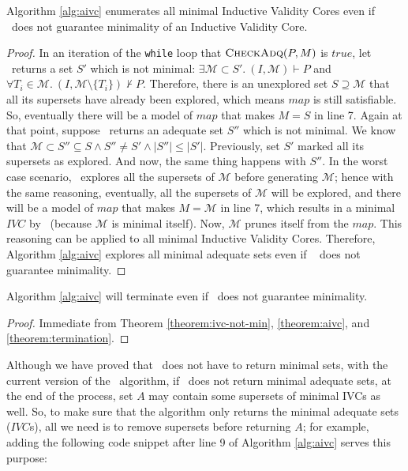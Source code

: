 \begin{theorem}
\label{theorem:ivc-not-min}
  Algorithm \ref{alg:aivc} enumerates all minimal Inductive Validity Cores
  even if \getivc ~does not guarantee minimality of an Inductive Validity Core.
\end{theorem}
\begin{proof}
In an iteration of the \texttt{while} loop that $\textsc{CheckAdq} (P, M)$ is $true$,
let \getivc ~returns a set $S'$ which is not minimal:
$\exists \mathcal{M} \subset S'.~ (I, \mathcal{M}) \vdash P$ and
$\forall T_i \in \mathcal{M} . ~ (I, \mathcal{M} \setminus \{T_i\}) \nvdash P$.
Therefore, there is an unexplored set $S \supseteq \mathcal{M}$ that all its supersets have already been explored, which means
$map$ is still satisfiable.
So, eventually there will be a model of $map$ that makes $M = S$ in line 7.
Again at that point, suppose \getivc ~returns an adequate set $S''$ which is not minimal.
We know that
  $\mathcal{M} \subset S'' \subseteq S \wedge S'' \neq S' \wedge |S''| \leq |S'|$.
  Previously, set $S'$ marked all its supersets as explored. And now, the
  same thing happens with $S''$.
  In the worst case scenario, \getivc
   ~explores all the supersets of $\mathcal{M}$
   before generating $\mathcal{M}$; hence with the same reasoning,
  eventually, all the supersets of $\mathcal{M}$ will be explored, and there will be a model of $map$ that makes $M = \mathcal{M}$ in line 7,
  which results in a minimal $IVC$ by \getivc ~(because $\mathcal{M}$ is minimal itself).
  Now,  $\mathcal{M}$  prunes itself from the $map$.
  This reasoning can be applied to all minimal Inductive Validity Cores.
  Therefore, Algorithm \ref{alg:aivc} explores all minimal adequate sets even if \getivc ~
  does not guarantee minimality.
\end{proof}

\begin{theorem}
 Algorithm \ref{alg:aivc} will terminate even if \getivc ~does not guarantee minimality.
\end{theorem}
\begin{proof}
  Immediate from Theorem \ref{theorem:ivc-not-min}, \ref{theorem:aivc}, and \ref{theorem:termination}.
\end{proof}

Although we have proved that \getivc ~does not have to return minimal sets,
with the current version of the \aivcalg ~algorithm, if \getivc ~does not
return minimal adequate sets, at the end of the process,
 set $A$ may contain some supersets of
minimal IVCs as well. So, to make sure that the algorithm only returns
the minimal adequate sets ($IVC$s), all we need is to
remove supersets before returning $A$; for example, adding the following code snippet after line 9 of Algorithm \ref{alg:aivc} serves this purpose:

